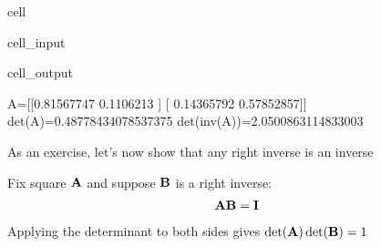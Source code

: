 \documentclass[letterpaper,10pt,english]{jupyterBook}
\begin{document}
\begin{sphinxuseclass}{cell}\begin{sphinxVerbatimInput}

\begin{sphinxuseclass}{cell_input}
\begin{sphinxVerbatim}[commandchars=\\\{\}]
   
    
\end{sphinxVerbatim}

\end{sphinxuseclass}\end{sphinxVerbatimInput}
\begin{sphinxVerbatimOutput}

\begin{sphinxuseclass}{cell_output}
\begin{sphinxVerbatim}[commandchars=\\\{\}]
A=[[\PYGZhy{}0.81567747 \PYGZhy{}0.1106213 ]
 [ 0.14365792 \PYGZhy{}0.57852857]]
det(A)=0.48778434078537375
det(inv(A))=2.0500863114833003
\end{sphinxVerbatim}

\end{sphinxuseclass}\end{sphinxVerbatimOutput}

\end{sphinxuseclass}
\sphinxAtStartPar
As an exercise, let’s now show that any right inverse is an inverse

\sphinxAtStartPar
Fix square \({\bf A}\) and suppose \({\bf B}\) is a right inverse:
\begin{equation}\label{equation:05.linear_algebra:eq:ud}
\begin{split}
%
{\bf A} {\bf B} = {\bf I}
%
\end{split}
\end{equation}
\sphinxAtStartPar
Applying the determinant to both sides gives \(\det({\bf A}) \det({\bf B}) = 1\)
\end{document}
